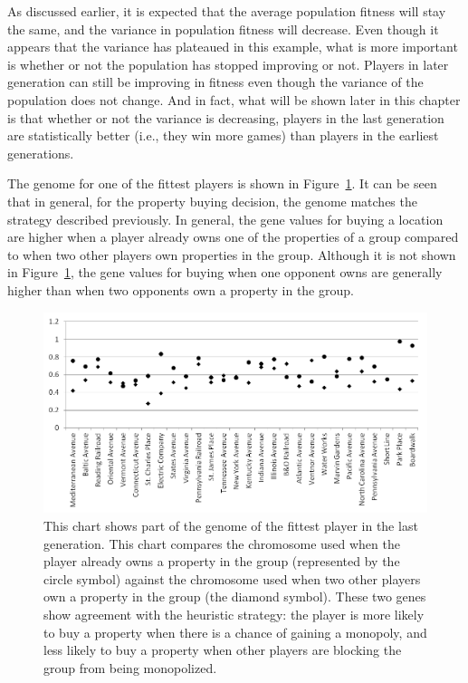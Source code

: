 As discussed earlier, it is expected that the average population fitness will
stay the same, and the variance in population fitness will decrease. Even though
it appears that the variance has plateaued in this example, what is more
important is whether or not the population has stopped improving or not. Players
in later generation can still be improving in fitness even though the variance
of the population does not change. And in fact, what will be shown later in this
chapter is that whether or not the variance is decreasing, players in the last
generation are statistically better (i.e., they win more games) than players in
the earliest generations.

The genome for one of the fittest players is shown in
Figure~\ref{figure-genome}. It can be seen that in general, for the property
buying decision, the genome matches the strategy described previously. In
general, the gene values for buying a location are higher when a player already
owns one of the properties of a group compared to when two other players own
properties in the group. Although it is not shown in Figure~\ref{figure-genome},
the gene values for buying when one opponent owns are generally higher than when
two opponents own a property in the group.

\begin{figure}[htp]
\centerline{\includegraphics[width=0.75\columnwidth]{Figures/genome.png}}
\caption[Illustration of Genome]{This chart shows part of the genome of the
fittest player in the last generation. This chart compares the chromosome used
when the player already owns a property in the group (represented by the circle
symbol) against the chromosome used when two other players own a property in the
group (the diamond symbol). These two genes show agreement with the heuristic
strategy: the player is more likely to buy a property when there is a chance of
gaining a monopoly, and less likely to buy a property when other players are
blocking the group from being monopolized.}
\label{figure-genome}
\end{figure}

